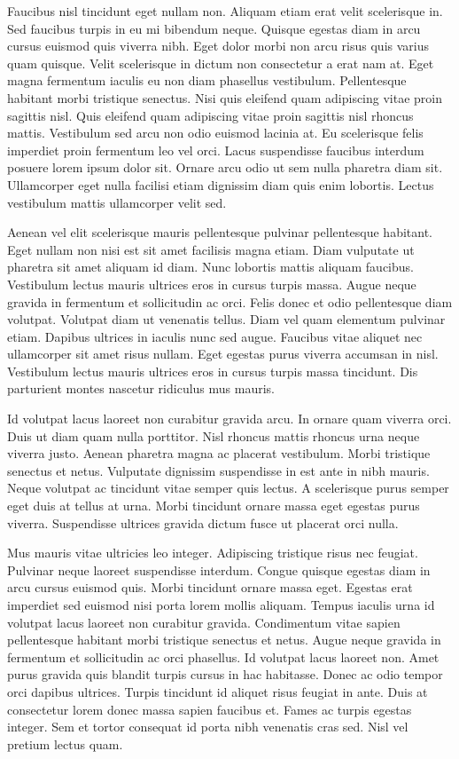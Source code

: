 \documentclass[11pt,a4paper]{article}
\begin{document}
Faucibus nisl tincidunt eget nullam non. Aliquam etiam erat velit scelerisque in. Sed faucibus turpis in eu mi bibendum neque. Quisque egestas diam in arcu cursus euismod quis viverra nibh. Eget dolor morbi non arcu risus quis varius quam quisque. Velit scelerisque in dictum non consectetur a erat nam at. Eget magna fermentum iaculis eu non diam phasellus vestibulum. Pellentesque habitant morbi tristique senectus. Nisi quis eleifend quam adipiscing vitae proin sagittis nisl. Quis eleifend quam adipiscing vitae proin sagittis nisl rhoncus mattis. Vestibulum sed arcu non odio euismod lacinia at. Eu scelerisque felis imperdiet proin fermentum leo vel orci. Lacus suspendisse faucibus interdum posuere lorem ipsum dolor sit. Ornare arcu odio ut sem nulla pharetra diam sit. Ullamcorper eget nulla facilisi etiam dignissim diam quis enim lobortis. Lectus vestibulum mattis ullamcorper velit sed.

Aenean vel elit scelerisque mauris pellentesque pulvinar pellentesque habitant. Eget nullam non nisi est sit amet facilisis magna etiam. Diam vulputate ut pharetra sit amet aliquam id diam. Nunc lobortis mattis aliquam faucibus. Vestibulum lectus mauris ultrices eros in cursus turpis massa. Augue neque gravida in fermentum et sollicitudin ac orci. Felis donec et odio pellentesque diam volutpat. Volutpat diam ut venenatis tellus. Diam vel quam elementum pulvinar etiam. Dapibus ultrices in iaculis nunc sed augue. Faucibus vitae aliquet nec ullamcorper sit amet risus nullam. Eget egestas purus viverra accumsan in nisl. Vestibulum lectus mauris ultrices eros in cursus turpis massa tincidunt. Dis parturient montes nascetur ridiculus mus mauris.

Id volutpat lacus laoreet non curabitur gravida arcu. In ornare quam viverra orci. Duis ut diam quam nulla porttitor. Nisl rhoncus mattis rhoncus urna neque viverra justo. Aenean pharetra magna ac placerat vestibulum. Morbi tristique senectus et netus. Vulputate dignissim suspendisse in est ante in nibh mauris. Neque volutpat ac tincidunt vitae semper quis lectus. A scelerisque purus semper eget duis at tellus at urna. Morbi tincidunt ornare massa eget egestas purus viverra. Suspendisse ultrices gravida dictum fusce ut placerat orci nulla.

Mus mauris vitae ultricies leo integer. Adipiscing tristique risus nec feugiat. Pulvinar neque laoreet suspendisse interdum. Congue quisque egestas diam in arcu cursus euismod quis. Morbi tincidunt ornare massa eget. Egestas erat imperdiet sed euismod nisi porta lorem mollis aliquam. Tempus iaculis urna id volutpat lacus laoreet non curabitur gravida. Condimentum vitae sapien pellentesque habitant morbi tristique senectus et netus. Augue neque gravida in fermentum et sollicitudin ac orci phasellus. Id volutpat lacus laoreet non. Amet purus gravida quis blandit turpis cursus in hac habitasse. Donec ac odio tempor orci dapibus ultrices. Turpis tincidunt id aliquet risus feugiat in ante. Duis at consectetur lorem donec massa sapien faucibus et. Fames ac turpis egestas integer. Sem et tortor consequat id porta nibh venenatis cras sed. Nisl vel pretium lectus quam.
\end{document}

